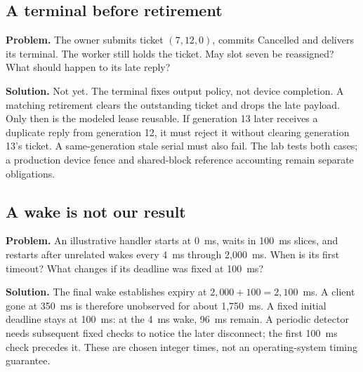 \begin{minipage}{\linewidth}
\subsection{A terminal before retirement}
\textbf{Problem.} The owner submits ticket $(7,12,0)$, commits Cancelled
and delivers its terminal. The worker still holds the ticket. May slot seven
be reassigned? What should happen to its late reply?

\textbf{Solution.} Not yet. The terminal fixes output policy, not device
completion. A matching retirement clears the outstanding ticket and drops
the late payload. Only then is the modeled lease reusable. If generation
13 later receives a duplicate reply from generation 12, it must reject it
without clearing generation 13's ticket. A same-generation stale serial
must also fail. The lab tests both cases; a production device fence and
shared-block reference accounting remain separate obligations.
\end{minipage}\par

\begin{minipage}{\linewidth}
\subsection{A wake is not our result}
\textbf{Problem.} An illustrative handler starts at 0~ms, waits in 100~ms
slices, and restarts after unrelated wakes every 4~ms through 2,000~ms.
When is its first timeout? What changes if its deadline was fixed at 100~ms?

\textbf{Solution.} The final wake establishes expiry at
$2{,}000+100=2{,}100$~ms. A client gone at 350~ms is therefore unobserved
for about 1,750~ms. A fixed initial deadline stays at 100~ms: at the 4~ms
wake, 96~ms remain. A periodic detector needs subsequent fixed checks to
notice the later disconnect; the first 100~ms check precedes it.
These are chosen integer times, not an operating-system timing guarantee.
\end{minipage}\par

